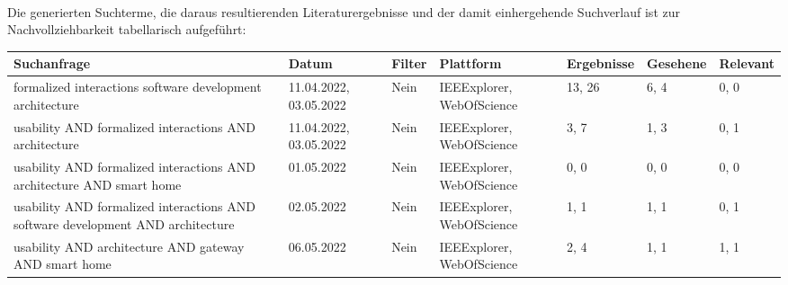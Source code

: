         \\
        Die generierten Suchterme, die daraus resultierenden Literaturergebnisse und der damit einhergehende Suchverlauf ist 
        zur Nachvollziehbarkeit tabellarisch aufgeführt:
        \\
        \linebreak
        \pagebreak
        \begin{table}[hbt!]
            \begin{center}
                \begin{tabular}{| p{2.9cm} | p{1.9cm} | p{1.6cm} | p{1.9cm} | p{1.9cm} | p{1.8cm} | p{1.8cm} | }
                    \hline
                        \textbf{Suchanfrage} & \textbf{Datum} & \textbf{Filter} & \textbf{Plattform} & \textbf{Ergebnisse} & \textbf{Gesehene} & \textbf{Relevant} \\
                    \hline
                        formalized interactions software development architecture  & 11.04.2022, 03.05.2022 & Nein & IEEExplorer, WebOfScience & 13, 26 & 6, 4 & 0, 0 \\ 
                    \hline
                        usability AND formalized interactions AND architecture & 11.04.2022, 03.05.2022 & Nein & IEEExplorer, WebOfScience & 3, 7 & 1, 3 & 0, 1 \\ %
                    \hline
                        usability AND formalized interactions AND architecture AND smart home & 01.05.2022 & Nein & IEEExplorer, WebOfScience & 0, 0 & 0, 0 & 0, 0 \\
                    \hline
                        usability AND formalized interactions AND software development AND architecture & 02.05.2022 & Nein & IEEExplorer, WebOfScience & 1, 1 & 1, 1 & 0, 1 \\
                    \hline
                        usability AND architecture AND gateway AND smart home & 06.05.2022 & Nein & IEEExplorer, WebOfScience & 2, 4 & 1, 1 & 1, 1 \\

\end{tabular}
\end{center}
\end{table}
